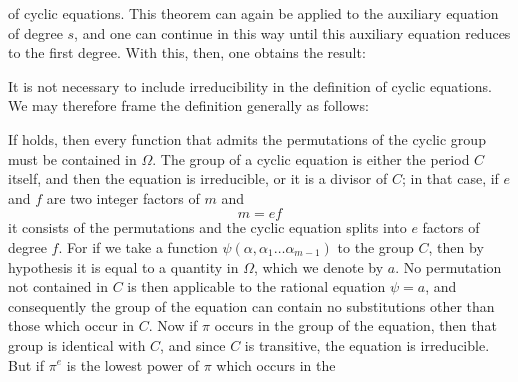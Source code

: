 of cyclic equations. This theorem can again be applied to the auxiliary equation of degree $s$, and one can continue in this way until this auxiliary equation reduces to the first degree. With this, then, one obtains the result:


It is not necessary to include irreducibility in the definition of cyclic equations. We may therefore frame the definition generally as follows:


If
holds, then every function that admits the permutations of the cyclic group
must be contained in $\Omega$.
The  group of a cyclic equation is either the period $C$ itself, and then the equation is irreducible, or it is a divisor of $C$; in that case, if $e$ and $f$ are two integer factors of $m$ and
\[
m = ef
\]
it consists of the permutations
and the cyclic equation splits into $e$ factors of degree $f$. For if we take a function $\psi(\alpha, \alpha_1 \ldots \alpha_{m-1})$  to the group $C$, then by hypothesis it is equal to a quantity in $\Omega$, which we denote by $a$. No permutation not contained in $C$ is then applicable to the rational equation $\psi = a$, and consequently the group of the equation can contain no substitutions other than those which occur in $C$. Now if $\pi$ occurs in the group of the equation, then that group is identical with $C$, and since $C$ is transitive, the equation is irreducible. But if $\pi^e$ is the lowest power of $\pi$ which occurs in the
